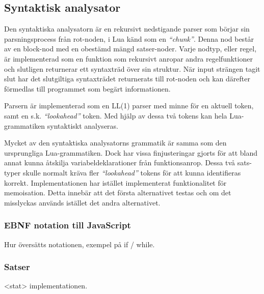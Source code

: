 \subsection{Syntaktisk analysator}

Den syntaktiska analysatorn är en rekursivt nedstigande parser som börjar sin
parsningsprocess från rot-noden, i Lua känd som en \textit{``chunk''}.
Denna nod består av en block-nod med en obestämd mängd satser-noder. Varje
nodtyp, eller regel, är implementerad som en funktion som rekursivt anropar
andra regelfunktioner och slutligen returnerar ett syntaxträd över sin
struktur. När input strängen tagit slut har det slutgiltiga syntaxträdet
returnerats till rot-noden och kan därefter förmedlas till programmet som
begärt informationen.


Parsern är implementerad som en LL(1) parser med minne för en aktuell token,
samt en s.k. \textit{``lookahead''} token. Med hjälp av dessa två tokens kan
hela Lua-grammatiken syntaktiskt analyseras.

Mycket av den syntaktiska analysatorns grammatik är samma som den ursprungliga
Lua-grammatiken. Dock har vissa finjusteringar gjorts för att bland annat
kunna åtskilja variabeldeklarationer från funktionsanrop. Dessa två sats-typer
skulle normalt kräva fler \textit{``lookahead''} tokens för att kunna
identifieras korrekt. Implementationen har istället implementerat
funktionalitet för memoisation. Detta innebär att det första alternativet
testas och om det misslyckas används istället det andra alternativet.


\subsubsection{EBNF notation till JavaScript}

Hur översätts notationen, exempel på if / while.

\subsubsection{Satser}

<stat> implementationen.

